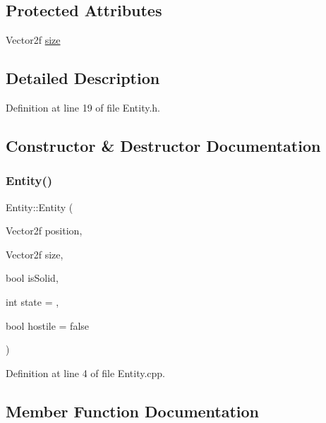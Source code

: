 \subsection*{Protected Attributes}
\begin{DoxyCompactItemize}
\item 
Vector2f \hyperlink{class_entity_ae9a0a364c85f91ade5088b3610131417}{size}
\end{DoxyCompactItemize}


\subsection{Detailed Description}


Definition at line 19 of file Entity.\+h.



\subsection{Constructor \& Destructor Documentation}
\mbox{\label{class_entity_a80b784625d59ece058c02726450127de}} 
\subsubsection{\texorpdfstring{Entity()}{Entity()}}
{\footnotesize\ttfamily Entity\+::\+Entity (\begin{DoxyParamCaption}\item[{Vector2f}]{position,  }\item[{Vector2f}]{size,  }\item[{bool}]{is\+Solid,  }\item[{int}]{state = {},  }\item[{bool}]{hostile = {\ttfamily false} }\end{DoxyParamCaption})}



Definition at line 4 of file Entity.\+cpp.



\subsection{Member Function Documentation}
\mbox{\label{class_entity_af8678a1582e2a478d66df1ff29b66a0d}} 
